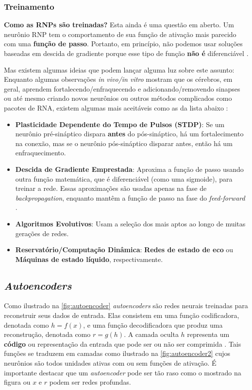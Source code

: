 		\subsubsection{Treinamento}
		
			\par \textbf{Como as RNPs são treinadas?} Esta ainda é uma questão em aberto. Um neurônio RNP tem o comportamento de sua função de ativação mais parecido com uma \textbf{função de passo}. Portanto, em princípio, não podemos usar soluções baseadas em descida de gradiente porque esse tipo de função \textbf{não é} diferenciável \cite{kasabov2019time}.
			
			\par Mas existem algumas ideias que podem lançar alguma luz sobre este assunto: Enquanto algumas observações \textit{in vivo/in vitro} mostram que os cérebros, em geral, aprendem fortalecendo/enfraquecendo e adicionando/removendo sinapses ou até mesmo criando novos neurônios ou outros métodos complicados como pacotes de RNA, existem algumas mais aceitáveis como as da lista abaixo \cite{kasabov2019time}:
			
			\begin{itemize}
				\item \textbf{Plasticidade Dependente do Tempo de Pulsos (STDP)}: Se um neurônio pré-sináptico dispara \textbf{antes} do pós-sináptico, há um fortalecimento na conexão, mas se o neurônio pós-sináptico disparar antes, então há um enfraquecimento.
				\item \textbf{Descida de Gradiente Emprestada}: Aproxima a função de passo usando outra função matemática, que é diferenciável (como uma sigmoide), para treinar a rede. Essas aproximações são usadas apenas na fase de \textit{backpropagation}, enquanto mantêm a função de passo na fase do \textit{feed-forward} \cite{kasabov2019time}.
				\item \textbf{Algoritmos Evolutivos}: Usam a seleção dos mais aptos ao longo de muitas gerações de redes.
				\item \textbf{Reservatório/Computação Dinâmica}: \textbf{Redes de estado de eco} ou \textbf{Máquinas de estado líquido}, respectivamente.
			\end{itemize}
		
		\subsection{\textit{Autoencoders}}
		
			\par Como ilustrado na  \autoref{fig:autoencoder} \textit{autoencoders} são redes neurais treinadas para reconstruir seus dados de entrada. Elas consistem em uma função codificadora, denotada como $h = f(x)$, e uma função decodificadora que produz uma reconstrução, denotada como $r = g(h)$. A camada oculta $h$ representa um \textbf{código} ou representação da entrada que pode ser ou não ser comprimida \cite{Goodfellow-et-al-2016}. Tais funções se traduzem em camadas como ilustrado na  \autoref{fig:autoencoder2} cujos neurônios são todos unidades ativas com ou sem funções de ativação. É importante destacar que um \textit{autoencoder} pode ser tão raso como o mostrado na figura ou $x$ e $r$ podem ser redes profundas.
			
